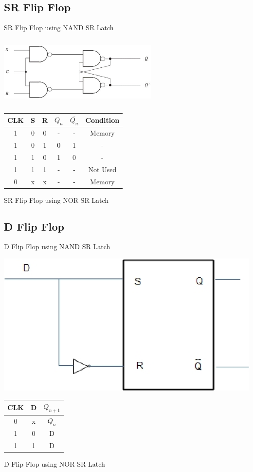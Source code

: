 \documentclass[journal,12pt,twocolumn]{IEEEtran}
\begin{document}
\subsection{SR Flip Flop}
\problem SR Flip Flop using NAND SR Latch

\vspace{0.5cm}
\includegraphics[width = 8cm, height = 3.5cm]{img/SRFlipFlop}
\begin{table}[h!]
\centering
\begin{tabular}{|c|cc|cc|c|}
\hline
CLK	&	S	&	R	&	$Q_n$	&	$\overline{Q_n}$	& Condition \\\hline
1	&	0	&	0	&	 -		&		-		&	Memory		\\\hline
1	&	0	&	1	&	0		&		1		&		-	\\\hline
1	&	1	&	0	&	1		&		0		&		-	\\\hline
1	&	1	&	1	&	-		&		-		&	Not Used		\\\hline	
0	&	x	&	x	&	-		&		-		&	Memory		\\\hline
\end{tabular}
\end{table}

\problem SR Flip Flop using NOR SR Latch
\subsection{D Flip Flop}
\problem D Flip Flop using NAND SR Latch

\vspace{0.5cm}
\includegraphics[scale=0.9]{img/D-FF-Circuit}
\begin{table}[h!]
\centering
\begin{tabular}{|c|c|c|}
\hline
CLK	&	D	&	$Q_{n+1}$ \\ \hline
0	&	x	&	$Q_{n}$	\\ \hline
1	&	0	&	D	\\\hline
1	&	1	&	D	\\\hline
\end{tabular}
\end{table}

\problem D Flip Flop using NOR SR Latch
\end{document}
